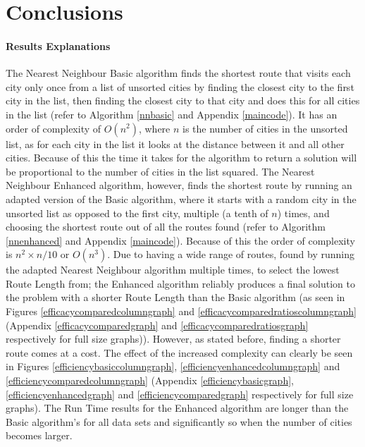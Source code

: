 \documentclass[conference,backref=page]{acmsiggraph}
\begin{document}
\section{Conclusions}
\paragraph{Results Explanations}
The Nearest Neighbour Basic algorithm finds the shortest route that visits each city only once from a list of unsorted cities by finding the closest city to the first city in the list, then finding the closest city to that city and does this for all cities in the list (refer to Algorithm \ref{nnbasic} and Appendix \ref{maincode}). It has an order of complexity of $O(n^2)$, where $n$ is the number of cities in the unsorted list, as for each city in the list it looks at the distance between it and all other cities. Because of this the time it takes for the algorithm to return a solution will be proportional to the number of cities in the list squared. The Nearest Neighbour Enhanced algorithm, however, finds the shortest route by running an adapted version of the Basic algorithm, where it starts with a random city in the unsorted list as opposed to the first city, multiple (a tenth of $n$) times, and choosing the shortest route out of all the routes found (refer to Algorithm \ref{nnenhanced} and Appendix \ref{maincode}). Because of this the order of complexity is $n^2 \times n/10$ or $O(n^3)$. Due to having a wide range of routes, found by running the adapted Nearest Neighbour algorithm multiple times, to select the lowest Route Length from; the Enhanced algorithm reliably produces a final solution to the problem with a shorter Route Length than the Basic algorithm (as seen in Figures \ref{efficacycomparedcolumngraph} and \ref{efficacycomparedratioscolumngraph} (Appendix \ref{efficacycomparedgraph} and \ref{efficacycomparedratiosgraph} respectively for full size graphs)). However, as stated before, finding a shorter route comes at a cost. The effect of the increased complexity can clearly be seen in Figures \ref{efficiencybasiccolumngraph}, \ref{efficiencyenhancedcolumngraph} and \ref{efficiencycomparedcolumngraph} (Appendix \ref{efficiencybasicgraph}, \ref{efficiencyenhancedgraph} and \ref{efficiencycomparedgraph} respectively for full size graphs). The Run Time results for the Enhanced algorithm are longer than the Basic algorithm's for all data sets and significantly so when the number of cities becomes larger.
\end{document}
